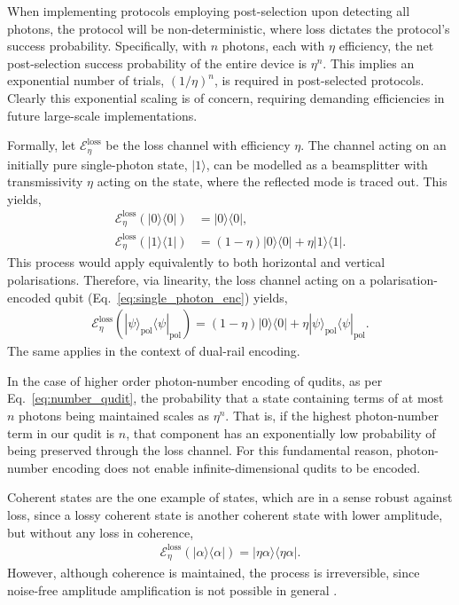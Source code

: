 \documentclass[aps,rmp,twocolumn,amsmath,amssymb,nofootinbib,superscriptaddress]{revtex4}
\newcommand{\bra}[1]{\langle#1|}
\newcommand{\ket}[1]{|#1\rangle}
\begin{document}
When implementing protocols employing post-selection upon detecting all photons, the protocol will be non-deterministic, where loss dictates the protocol's success probability. Specifically, with $n$ photons, each with $\eta$ efficiency, the net post-selection success probability of the entire device is $\eta^n$. This implies an exponential number of trials, \mbox{$(1/\eta)^n$}, is required in post-selected protocols. Clearly this exponential scaling is of concern, requiring demanding efficiencies in future large-scale implementations.

Formally, let $\mathcal{E}^\mathrm{loss}_\eta$ be the loss channel with efficiency $\eta$. The channel acting on an initially pure single-photon state, $\ket{1}$, can be modelled as a beamsplitter with transmissivity $\eta$ acting on the state, where the reflected mode is traced out. This yields,
\begin{align}
\mathcal{E}^\mathrm{loss}_\eta(\ket{0}\bra{0}) &= \ket{0}\bra{0}, \nonumber \\
\mathcal{E}^\mathrm{loss}_\eta(\ket{1}\bra{1}) &= (1-\eta)\ket{0}\bra{0} + \eta\ket{1}\bra{1}.
\end{align}
This process would apply equivalently to both horizontal and vertical polarisations. Therefore, via linearity, the loss channel acting on a polarisation-encoded qubit (Eq.~\ref{eq:single_photon_enc}) yields,
\begin{align}
\mathcal{E}^\mathrm{loss}_\eta(\ket\psi_\mathrm{pol}\bra\psi_\mathrm{pol}) = (1-\eta) \ket{0}\bra{0} + \eta\ket\psi_\mathrm{pol}\bra\psi_\mathrm{pol}.
\end{align}
The same applies in the context of dual-rail encoding.

In the case of higher order photon-number encoding of qudits, as per Eq.~\ref{eq:number_qudit}, the probability that a state containing terms of at most $n$ photons being maintained scales as $\eta^n$. That is, if the highest photon-number term in our qudit is $n$, that component has an exponentially low probability of being preserved through the loss channel. For this fundamental reason, photon-number encoding does not enable infinite-dimensional qudits to be encoded.

Coherent states are the one example of states, which are in a sense robust against loss, since a lossy coherent state is another coherent state with lower amplitude, but without any loss in coherence,
\begin{align}
\mathcal{E}^\mathrm{loss}_\eta(\ket\alpha\bra\alpha) = \ket{\eta\alpha}\bra{\eta\alpha}.
\end{align}
However, although coherence is maintained, the process is irreversible, since noise-free amplitude amplification is not possible in general \cite{???}.
\end{document}
